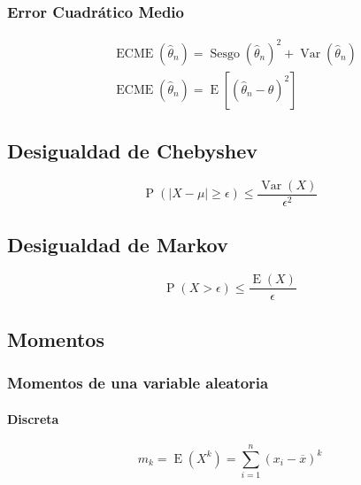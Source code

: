 \documentclass[
]{article}
\begin{document}
\hypertarget{error-cuadruxe1tico-medio}{%
\subsubsection{Error Cuadrático Medio}\label{error-cuadruxe1tico-medio}}

\[
\begin{align*}
    & \operatorname{ECME}(\hat{\theta}_n) = \operatorname{Sesgo}(\hat{\theta}_n)^2 + \operatorname{Var}(\hat{\theta}_n) \\
    & \operatorname{ECME}(\hat{\theta}_n) = \operatorname{E}[(\hat{\theta}_n - \theta)^2]
\end{align*}
\]

\hypertarget{desigualdad-de-chebyshev}{%
\subsection{Desigualdad de Chebyshev}\label{desigualdad-de-chebyshev}}

\[
    \operatorname{P}(|X - \mu| \geq \epsilon) \leq \frac{\operatorname{Var}(X)}{\epsilon^2}
\]

\hypertarget{desigualdad-de-markov}{%
\subsection{Desigualdad de Markov}\label{desigualdad-de-markov}}

\[
    \operatorname{P}(X > \epsilon) \leq \frac{\operatorname{E}(X)}{\epsilon}
\]

\hypertarget{momentos}{%
\subsection{Momentos}\label{momentos}}

\hypertarget{momentos-de-una-variable-aleatoria}{%
\subsubsection{Momentos de una variable
aleatoria}\label{momentos-de-una-variable-aleatoria}}

\hypertarget{discreta}{%
\paragraph{Discreta}\label{discreta}}

\[
    m_{k} = \operatorname{E}(X^{k}) = \sum_{i=1}^{n}{(x_i - \overline{x}) ^ k}
\]
\end{document}
